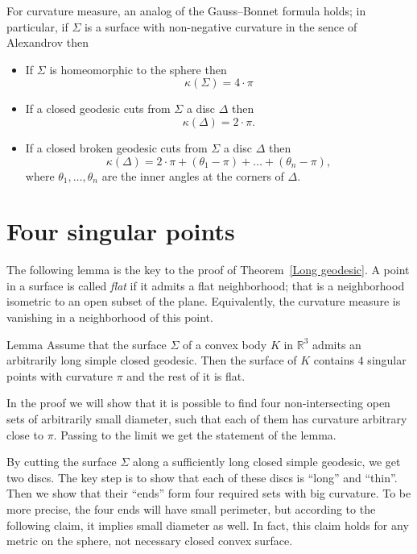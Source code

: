 \documentclass[oneside,a4paper, 12pt]{article}
\begin{document}
For curvature measure, an analog of the Gauss--Bonnet formula holds;
in particular, if $\Sigma$ is a surface with non-negative curvature in the sence of Alexandrov then
\begin{itemize}
\item If $\Sigma$ is homeomorphic to the sphere then 
\[\kappa(\Sigma)=4{\cdot}\pi\]
\item If a closed geodesic cuts from $\Sigma$ a disc $\Delta$ then 
\[\kappa(\Delta)=2{\cdot}\pi.\]
\item If a closed broken geodesic cuts from $\Sigma$ a disc $\Delta$ then 
\[\kappa(\Delta)=2{\cdot}\pi +(\theta_1-\pi)+\dots+(\theta_n-\pi),\]
where $\theta_1,\dots,\theta_n$ are the inner angles at the corners of $\Delta$.
\end{itemize}


\section{Four singular points}

The following lemma is the key to the proof of Theorem~\ref{Long geodesic}.
A point in a surface is called \emph{flat} if it admits a flat neighborhood;
that is a neighborhood isometric to an open subset of the plane.
Equivalently, the curvature measure is vanishing in a neighborhood of this point.

\begin{thm}{Lemma} 
	\label{lem:4 singular points}
Assume that the surface $\Sigma$ of a convex body $K$ in $\mathbb{R}^3$
admits an arbitrarily long simple closed geodesic.
Then the surface of $K$ contains $4$ singular points with curvature $\pi$ and the rest of it is flat.
\end{thm}

In the proof we will show that 
it is possible to find four non-intersecting open sets of arbitrarily small diameter, 
such that each of them has curvature arbitrary close to $\pi$.
Passing to the limit we get the statement of the lemma.

By cutting the surface $\Sigma$ along a sufficiently long closed simple geodesic,
we get two discs.
The key step is to show that each of these discs is ``long'' and ``thin''.
Then we show that their ``ends'' form four required sets with big curvature.
To be more precise, the four ends will have small perimeter,
but according to the following claim, it implies small diameter as well.
In fact, this claim holds for any metric on the sphere, not necessary closed convex surface.
\end{document}
